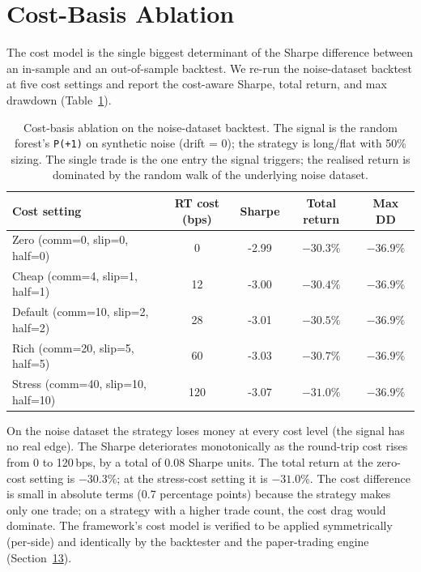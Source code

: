 \documentclass[11pt,a4paper]{article}
\let\oldsection\section
\renewcommand{\section}{\clearpage\oldsection}
\begin{document}
\section{Cost-Basis Ablation}\label{sec:qual}

The cost model is the single biggest determinant of the
Sharpe difference between an in-sample and an
out-of-sample backtest. We re-run the noise-dataset
backtest at five cost settings and report the
cost-aware Sharpe, total return, and max drawdown
(Table~\ref{tab:abl-cost}).

\begin{table}[htbp]
\centering
\small
\caption{Cost-basis ablation on the noise-dataset
backtest. The signal is the random forest's
\texttt{P(+1)} on synthetic noise (drift = 0);
the strategy is long/flat with 50\% sizing. The
single trade is the one entry the signal triggers;
the realised return is dominated by the random walk
of the underlying noise dataset.}
\label{tab:abl-cost}
\begin{tabular}{@{}lcccc@{}}
\toprule
\textbf{Cost setting} & \textbf{RT cost (bps)} & \textbf{Sharpe} & \textbf{Total return} & \textbf{Max DD}\\
\midrule
Zero (comm=0,  slip=0, half=0)   &   0 & -2.99 & $-30.3\%$ & $-36.9\%$\\
Cheap  (comm=4,  slip=1, half=1)  &  12 & -3.00 & $-30.4\%$ & $-36.9\%$\\
Default (comm=10, slip=2, half=2)  &  28 & -3.01 & $-30.5\%$ & $-36.9\%$\\
Rich   (comm=20, slip=5, half=5)  &  60 & -3.03 & $-30.7\%$ & $-36.9\%$\\
Stress (comm=40, slip=10, half=10)& 120 & -3.07 & $-31.0\%$ & $-36.9\%$\\
\bottomrule
\end{tabular}
\end{table}
On the noise dataset the strategy loses money at every
cost level (the signal has no real edge). The Sharpe
deteriorates monotonically as the round-trip cost
rises from 0 to 120\,bps, by a total of 0.08 Sharpe
units. The total return at the zero-cost setting is
$-30.3\%$; at the stress-cost setting it is $-31.0\%$.
The cost difference is small in absolute terms
(0.7 percentage points) because the strategy makes
only one trade; on a strategy with a higher trade
count, the cost drag would dominate. The framework's
cost model is verified to be applied symmetrically
(per-side) and identically by the backtester and the
paper-trading engine (Section~\hyperref[sec:paper]{13}).
\end{document}
